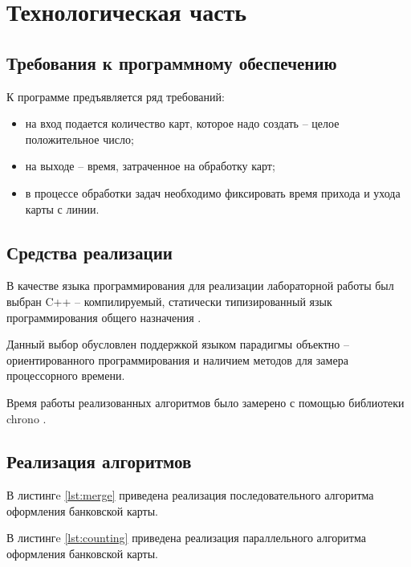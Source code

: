 \section{Технологическая часть}

\subsection{Требования к программному обеспечению}

К программе предъявляется ряд требований:
\begin{itemize}[label*=---]
	\item на вход подается количество карт, которое надо создать -- целое положительное число;
	\item на выходе -- время, затраченное на обработку карт;
	\item в процессе обработки задач необходимо фиксировать время прихода и ухода карты с линии.
\end{itemize}

\subsection{Средства реализации}

В качестве языка программирования для реализации лабораторной работы был выбран C++ -- компилируемый, статически типизированный язык программирования общего назначения \cite{cpp}. 

Данный выбор обусловлен поддержкой языком парадигмы объектно -- ориентированного программирования и наличием методов для замера процессорного времени.

Время работы реализованных алгоритмов было замерено с помощью библиотеки chrono \cite{chrono}.

\subsection{Реализация алгоритмов}

В листингe \ref{lst:merge} приведена реализация последовательного алгоритма оформления банковской карты.

В листингe \ref{lst:counting} приведена реализация параллельного алгоритма оформления банковской карты.
\pagebreak
{}

